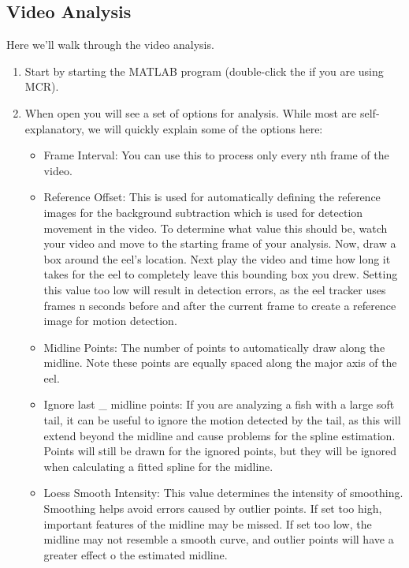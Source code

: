 \documentclass[11pt]{report}
\begin{document}
\subsection{Video Analysis}

Here we'll walk through the video analysis.

\begin{enumerate}
	\item Start by starting the MATLAB program (double-click the  if you are using MCR).


	\item When open you will see a set of options for analysis.
	      While most are self-explanatory, we will quickly explain some of the options here:
	      \begin{itemize}

	      	\item Frame Interval: You can use this to process only every nth frame of the video.

	      	\item Reference Offset: This is used for automatically defining the reference images for the background subtraction which is used for detection movement in the video.
	      	      To determine what value this should be, watch your video and move to the starting frame of your analysis.
	      	      Now, draw a box around the eel's location.
	      	      Next play the video and time how long it takes for the eel to completely leave this bounding box you drew.
	      	      Setting this value too low will result in detection errors, as the eel tracker uses frames n seconds before and after the current frame to create a reference image for motion detection.

	      	\item Midline Points: The number of points to automatically draw along the midline.
	      	      Note these points are equally spaced along the major axis of the eel.

	      	\item Ignore last \_ midline points:  If you are analyzing a fish with a large soft tail, it can be useful to ignore the motion detected by the tail, as this will extend beyond the midline and cause problems for the spline estimation.
	      	      Points will still be drawn for the ignored points, but they will be ignored when calculating a fitted spline for the midline.

	      	\item Loess Smooth Intensity: This value determines the intensity of smoothing.
	      	      Smoothing helps avoid errors caused by outlier points.
	      	      If set too high, important features of the midline may be missed.
	      	      If set too low, the midline may not resemble a smooth curve, and outlier points will have a greater effect o the estimated midline.


\end{itemize}
\end{enumerate}
\end{document}
